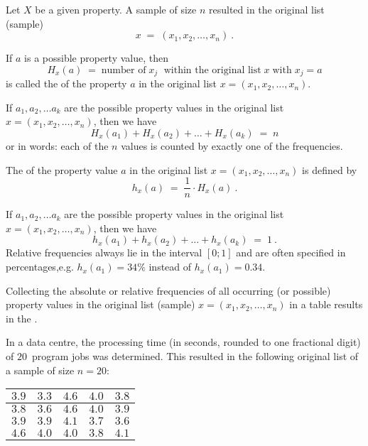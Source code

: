 
\begin{MIntro}

Let $X$ be a given property. A sample of size $n$ resulted in the original list (sample)
$$
x \;=\; (x_{1},x_{2},\ldots ,x_{n})\: .
$$

\begin{MInfo}
If $a$ is a possible property value, then 
$$
H_{x}(a)\; =\; \text{number of}\;x_{j}\;\text{ within the original list}\;x\;\text{with}\;x_{j}=a
$$
is called the  of the property 
$a$ in the original list $x=(x_{1},x_{2},\ldots ,x_{n})$.
\end{MInfo}

If $a_{1}, a_{2},\ldots a_{k}$ are the possible property values in the original list
$x=(x_{1},x_{2},\ldots ,x_{n})$, then we have
$$
H_{x}(a_{1})+H_{x}(a_{2})+\ldots + H_{x}(a_{k})\; =\; n
$$
or in words: each of the $n$ values is counted by exactly one of the frequencies.

\begin{MInfo}
The  of the property value $a$ in the original list  
$x=(x_{1},x_{2},\ldots ,x_{n})$ is defined by
$$
h_{x}(a)\; =\;\frac{1}{n}\cdot H_{x}(a)\: .
$$
\end{MInfo}

If $a_{1}, a_{2},\ldots a_{k}$ are the possible property values in the original list
$x=(x_{1},x_{2},\ldots ,x_{n})$, then we have
$$
h_{x}(a_{1})+h_{x}(a_{2})+\ldots + h_{x}(a_{k})\; =\;1\: .
$$
Relative frequencies always lie in the interval $[0;1]$ and are often specified in percentages,e.g. $h_x(a_1)=34\%$ instead of $h_x(a_1)=0.34$.

\begin{MInfo}
Collecting the absolute or relative frequencies of all occurring (or possible) property values 
in the original list (sample) $x=(x_{1},x_{2},\ldots ,x_{n})$ in a table results in the
.
\end{MInfo}

\begin{MExample}

In a data centre, the processing time (in seconds, rounded to one fractional digit)
of $20$~program jobs was determined. This resulted in the following original list of a sample of size $n=20$:
\begin{center}
\begin{tabular}{|l|l|l|l|l|}
\hline
$3.9$ & $3.3$ & $4.6$ & $4.0$ & $3.8$ \\ \hline
$3.8$ & $3.6$ & $4.6$ & $4.0$ & $3.9$ \\ \hline
$3.9$ & $3.9$ & $4.1$ & $3.7$ & $3.6$ \\ \hline
$4.6$ & $4.0$ & $4.0$ & $3.8$ & $4.1$ \\ \hline
\end{tabular}
\end{center}


\end{MExample}
\end{MIntro}
